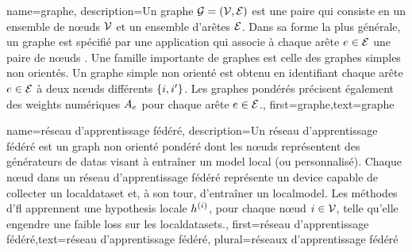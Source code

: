 
{name={graphe},
	description={Un graphe $\mathcal{G} = \left( \mathcal{V},\mathcal{E} \right)$ est une paire qui consiste en un ensemble de nœuds $\mathcal{V}$ et un ensemble d’arêtes $\mathcal{E}$. Dans sa forme la plus générale, un graphe est spécifié par une application qui associe à chaque arête $e \in \mathcal{E}$ une paire de nœuds \cite{RockNetworks}. Une famille importante de graphes est celle des graphes simples non orientés. Un graphe simple non orienté est obtenu en identifiant chaque arête $e \in \mathcal{E}$ à deux nœuds différents $\{i,i'\}$. Les graphes pondérés précisent également des \gls{weights} numériques $A_{e}$ pour chaque arête $e \in \mathcal{E}$.},
	first={graphe},text={graphe}
}


{name={réseau d'apprentissage fédéré},
	description={Un réseau d'apprentissage fédéré est un \gls{graph} non orienté pondéré dont les nœuds représentent des générateurs de \glspl{data} visant à entraîner un \gls{model} local (ou personnalisé). Chaque nœud dans un réseau d'apprentissage fédéré représente un \gls{device} capable de collecter un \gls{localdataset} et, à son tour, d’entraîner un \gls{localmodel}. Les méthodes d'\gls{fl} apprennent une \gls{hypothesis} locale $h^{(i)}$, pour chaque nœud $i \in \mathcal{V}$, telle qu’elle engendre une faible \gls{loss} sur les \glspl{localdataset}.},
	first={réseau d'apprentissage fédéré},text={réseau d'apprentissage fédéré}, plural={réseaux d'apprentissage fédéré}
}

